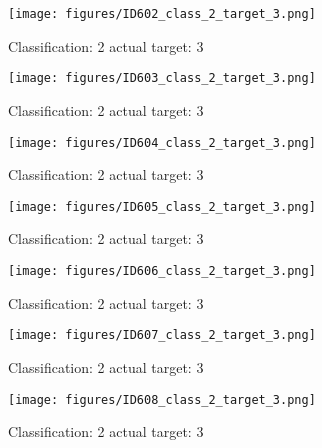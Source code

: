 \begin{figure}[h!]
\begin{center}
\texttt{[image: figures/ID602\_class\_2\_target\_3.png]}
\end{center}
\caption{ Classification: 2 actual target: 3}
\label{fig:ID602_class_2_target_3}
\end{figure}
\begin{figure}[h!]
\begin{center}
\texttt{[image: figures/ID603\_class\_2\_target\_3.png]}
\end{center}
\caption{ Classification: 2 actual target: 3}
\label{fig:ID603_class_2_target_3}
\end{figure}
\begin{figure}[h!]
\begin{center}
\texttt{[image: figures/ID604\_class\_2\_target\_3.png]}
\end{center}
\caption{ Classification: 2 actual target: 3}
\label{fig:ID604_class_2_target_3}
\end{figure}
\begin{figure}[h!]
\begin{center}
\texttt{[image: figures/ID605\_class\_2\_target\_3.png]}
\end{center}
\caption{ Classification: 2 actual target: 3}
\label{fig:ID605_class_2_target_3}
\end{figure}
\begin{figure}[h!]
\begin{center}
\texttt{[image: figures/ID606\_class\_2\_target\_3.png]}
\end{center}
\caption{ Classification: 2 actual target: 3}
\label{fig:ID606_class_2_target_3}
\end{figure}
\begin{figure}[h!]
\begin{center}
\texttt{[image: figures/ID607\_class\_2\_target\_3.png]}
\end{center}
\caption{ Classification: 2 actual target: 3}
\label{fig:ID607_class_2_target_3}
\end{figure}
\begin{figure}[h!]
\begin{center}
\texttt{[image: figures/ID608\_class\_2\_target\_3.png]}
\end{center}
\caption{ Classification: 2 actual target: 3}
\label{fig:ID608_class_2_target_3}
\end{figure}
